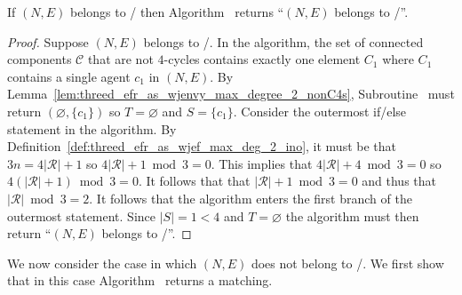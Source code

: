 \begin{lem}
\label{lem:threed_efr_as_wjenvy_max_degree_2_algo_valid_part1_ino}
If $(N, E)$ belongs to \iwjnomaxdegreetwofamily/ then Algorithm~ returns ``$(N, E)$ belongs to \iwjnomaxdegreetwofamily/''.
\end{lem}
\begin{proof}
Suppose $(N, E)$ belongs to \iwjnomaxdegreetwofamily/. In the algorithm, the set of connected components $\mathcal{C}$ that are not $4$-cycles contains exactly one element $C_1$ where $C_1$ contains a single agent $c_1$ in $(N, E)$. By Lemma~\ref{lem:threed_efr_as_wjenvy_max_degree_2_nonC4s}, Subroutine~ must return $(\varnothing, \{ c_1 \})$ so $T = \varnothing$ and $S = \{ c_1 \}$. Consider the outermost if/else statement in the algorithm. By Definition~\ref{def:threed_efr_as_wjef_max_deg_2_ino}, it must be that $3n = 4|\mathcal{R}| + 1$ so $4|\mathcal{R}| + 1 \bmod 3 = 0$. This implies that $4|\mathcal{R}| + 4 \bmod 3 = 0$ so $4(|\mathcal{R}| + 1) \bmod 3 = 0$. It follows that that $|\mathcal{R}| + 1 \bmod 3 = 0$ and thus that $|\mathcal{R}| \bmod 3 = 2$. It follows that the algorithm enters the first branch of the outermost  statement. Since $|S| = 1 < 4$ and $T = \varnothing$ the algorithm must then return ``$(N, E)$ belongs to \iwjnomaxdegreetwofamily/''.
\end{proof}

We now consider the case in which $(N, E)$ does not belong to \iwjnomaxdegreetwofamily/. We first show that in this case Algorithm~ returns a matching.

